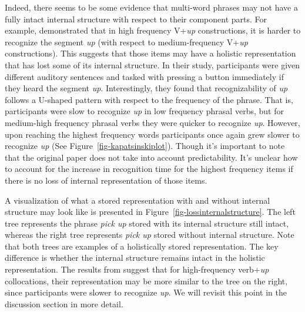 \documentclass[
  authoryear,
  preprint,
  1p,
  onecolumn]{elsarticle}
\begin{document}
Indeed, there seems to be some evidence that multi-word phrases may not
have a fully intact internal structure with respect to their component
parts. For example, \citet{kapatsinski2009} demonstrated that in high
frequency V+\emph{up} constructions, it is harder to recognize the
segment \emph{up} (with respect to medium-frequency V+\emph{up}
constructions). This suggests that those items may have a holistic
representation that has lost some of its internal structure. In their
study, participants were given different auditory sentences and tasked
with pressing a button immediately if they heard the segment \emph{up}.
Interestingly, they found that recognizability of \emph{up} follows a
U-shaped pattern with respect to the frequency of the phrase. That is,
participants were slow to recognize \emph{up} in low frequency phrasal
verbs, but for medium-high frequency phrasal verbs they were quicker to
recognize \emph{up}. However, upon reaching the highest frequency words
participants once again grew slower to recognize \emph{up} (See
Figure~\ref{fig-kapatsinskiplot}). Though it's important to note that
the original paper does not take into account predictability. It's
unclear how to account for the increase in recognition time for the
highest frequency items if there is no loss of internal representation
of those items.

A visualization of what a stored representation with and without
internal structure may look like is presented in
Figure~\ref{fig-lossinternalstructure}. The left tree represents the
phrase \emph{pick up} stored with its internal structure still intact,
whereas the right tree represents \emph{pick up} stored without internal
structure. Note that both trees are examples of a holistically stored
representation. The key difference is whether the internal structure
remains intact in the holistic representation. The results from
\citet{kapatsinski2009} suggest that for high-frequency verb+\emph{up}
collocations, their representation may be more similar to the tree on
the right, since participants were slower to recognize \emph{up}. We
will revisit this point in the discussion section in more detail.
\end{document}
